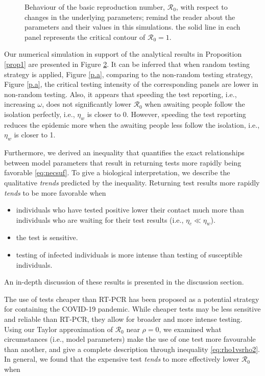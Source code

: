 \documentclass[12pt]{article}
\newcommand{\Rnum}{\mathcal{R}_0}
\theoremstyle{definition} %
\begin{document}
\begin{figure}[h!]
\begin{subfigure}[t]{.45\textwidth}
\caption{}\label{p.b}
\end{subfigure}
\caption{Behaviour of the basic reproduction number, $\Rnum$, with respect to changes in the underlying parameters; remind the reader about the parameters and their values in this simulations. the solid line in each panel represents the critical contour of $\Rnum=1$.}
\label{pan}
\end{figure}

Our numerical simulation in support of the analytical results in Proposition \ref{prop1} are presented in Figure \ref{pan}. It can be inferred that when random testing strategy is applied, Figure \ref{p.a}, comparing to the non-random testing strategy, Figure \ref{p.a}, the critical testing intensity of the corresponding panels are lower in non-random testing. Also, it appears that speeding the test reporting, i.e., increasing $\omega$, does not significantly lower $\Rnum$ when awaiting people follow the isolation perfectly, i.e., $\eta_w$ is closer to 0. However, speeding the test reporting reduces the epidemic more when the awaiting people less follow the isolation, i.e., $\eta_w$ is closer to 1. 

Furthermore, we derived an inequality that quantifies the exact relationships between model parameters that result in returning tests more rapidly being favorable \eqref{eq:necsuf}. To give a biological interpretation, we describe the qualitative \textit{trends} predicted by the inequality. Returning test results more rapidly \textit{tends} to be more favorable when

\begin{itemize}
    \item individuals who have tested positive lower their contact much more than individuals who are waiting for their test results (i.e., $\eta_c \ll \eta_w$).
    \item the test is sensitive.
    \item testing of infected individuals is more intense than testing of susceptible individuals.
\end{itemize}
An in-depth discussion of these results is presented in the discussion section. 

The use of tests cheaper than RT-PCR has been proposed as a potential strategy for containing the COVID-19 pandemic. While cheaper tests may be less sensitive and reliable than RT-PCR, they allow for broader and more intense testing. Using our Taylor approximation of $\Rnum$ near $\rho = 0$, we examined what circumstances (i.e., model parameters) make the use of one test more favourable than another, and give a complete description through inequality \ref{eq:rho1vsrho2}. In general, we found that the expensive test \textit{tends} to more effectively lower $\Rnum$ when
\end{document}
